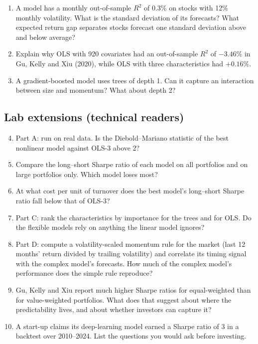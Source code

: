 \begin{enumerate}
  \item A model has a monthly out-of-sample $R^2$ of 0.3\% on stocks with 12\% monthly volatility. What is the standard deviation of its forecasts? What expected return gap separates stocks forecast one standard deviation above and below average?
  \item Explain why OLS with 920 covariates had an out-of-sample $R^2$ of $-3.46\%$ in Gu, Kelly and Xiu (2020), while OLS with three characteristics had $+0.16\%$.
  \item A gradient-boosted model uses trees of depth 1. Can it capture an interaction between size and momentum? What about depth 2?
\end{enumerate}

\subsection*{Lab extensions (technical readers)}

\begin{enumerate}
  \setcounter{enumi}{3}
  \item Part A: run on real data. Is the Diebold--Mariano statistic of the best nonlinear model against OLS-3 above 2?
  \item Compare the long--short Sharpe ratio of each model on all portfolios and on large portfolios only. Which model loses most?
  \item At what cost per unit of turnover does the best model's long--short Sharpe ratio fall below that of OLS-3?
  \item Part C: rank the characteristics by importance for the trees and for OLS. Do the flexible models rely on anything the linear model ignores?
  \item Part D: compute a volatility-scaled momentum rule for the market (last 12 months' return divided by trailing volatility) and correlate its timing signal with the complex model's forecasts. How much of the complex model's performance does the simple rule reproduce?
  \item Gu, Kelly and Xiu report much higher Sharpe ratios for equal-weighted than for value-weighted portfolios. What does that suggest about where the predictability lives, and about whether investors can capture it?
  \item A start-up claims its deep-learning model earned a Sharpe ratio of 3 in a backtest over 2010--2024. List the questions you would ask before investing.
\end{enumerate}


